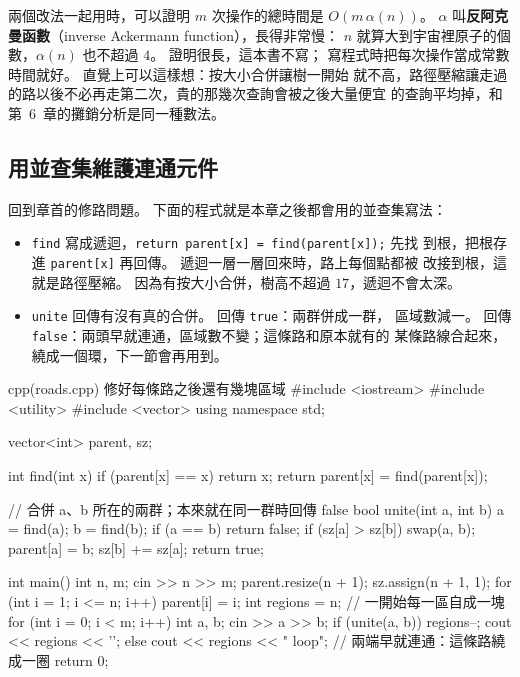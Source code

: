 兩個改法一起用時，可以證明 $m$ 次操作的總時間是 $O(m \, \alpha(n))$。
$\alpha$ 叫\textbf{反阿克曼函數}（inverse Ackermann function），長得非常慢：
$n$ 就算大到宇宙裡原子的個數，$\alpha(n)$ 也不超過 $4$。 證明很長，這本書不寫；
寫程式時把每次操作當成常數時間就好。 直覺上可以這樣想：按大小合併讓樹一開始
就不高，路徑壓縮讓走過的路以後不必再走第二次，貴的那幾次查詢會被之後大量便宜
的查詢平均掉，和第~6~章的攤銷分析是同一種數法。

\subsection{用並查集維護連通元件}

回到章首的修路問題。 下面的程式就是本章之後都會用的並查集寫法：

\begin{itemize}
\item \texttt{find} 寫成遞迴，\texttt{return parent[x] = find(parent[x]);} 先找
到根，把根存進 \texttt{parent[x]} 再回傳。 遞迴一層一層回來時，路上每個點都被
改接到根，這就是路徑壓縮。 因為有按大小合併，樹高不超過 $17$，遞迴不會太深。
\item \texttt{unite} 回傳有沒有真的合併。 回傳 \texttt{true}：兩群併成一群，
區域數減一。 回傳 \texttt{false}：兩頭早就連通，區域數不變；這條路和原本就有的
某條路線合起來，繞成一個環，下一節會再用到。
\end{itemize}

\begin{example}[label=ex:repair-roads]{cpp}{(roads.cpp) 修好每條路之後還有幾塊區域}
#include <iostream>
#include <utility>
#include <vector>
using namespace std;

vector<int> parent, sz;

int find(int x) {
    if (parent[x] == x) {
        return x;
    }
    return parent[x] = find(parent[x]);
}

// 合併 a、b 所在的兩群；本來就在同一群時回傳 false
bool unite(int a, int b) {
    a = find(a);
    b = find(b);
    if (a == b) {
        return false;
    }
    if (sz[a] > sz[b]) {
        swap(a, b);
    }
    parent[a] = b;
    sz[b] += sz[a];
    return true;
}

int main() {
    int n, m;
    cin >> n >> m;
    parent.resize(n + 1);
    sz.assign(n + 1, 1);
    for (int i = 1; i <= n; i++) {
        parent[i] = i;
    }
    int regions = n;                       // 一開始每一區自成一塊
    for (int i = 0; i < m; i++) {
        int a, b;
        cin >> a >> b;
        if (unite(a, b)) {
            regions--;
            cout << regions << '\n';
        } else {
            cout << regions << " loop\n";  // 兩端早就連通：這條路繞成一圈
        }
    }
    return 0;
}
\end{example}


